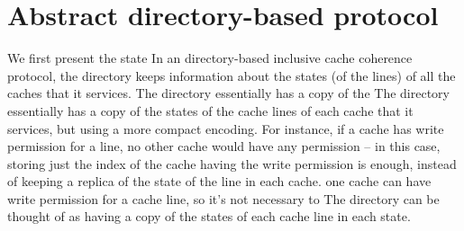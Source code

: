 \section{Abstract directory-based protocol}
\label{sec:setup}

We first present the state
In an directory-based inclusive cache coherence protocol, the directory keeps
information about the states (of the lines) of all the caches that it services.
The directory essentially has a copy of the 
The directory essentially has a copy of the states of the cache lines of each
cache that it services, but using a more compact encoding. For instance, if a
cache has write permission for a line, no other cache would have any permission
-- in this case, storing just the index of the cache having the write permission is enough,
instead of keeping a replica of the state of the line in each cache.  one
cache can have write permission for a cache line, so it's not necessary to 
The directory can be thought of as having a copy of the states of each cache
line in each state. 
